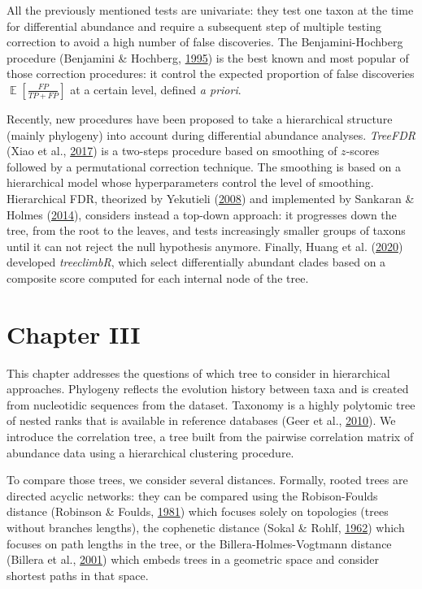 \documentclass[12pt,a4paper]{reedthesis}
\DeclareMathOperator*{\esp}{\mathbb{E}}
\newcommand \EE [1]{\esp\left[{#1}\right]}
\theoremstyle{definition}
\theoremstyle{definition}
\theoremstyle{definition}
\theoremstyle{remark}
\begin{document}
All the previously mentioned tests are univariate: they test one taxon at the time for differential abundance and require a subsequent step of multiple testing correction to avoid a high number of false discoveries. The Benjamini-Hochberg procedure (Benjamini \& Hochberg, \protect\hyperlink{ref-benjamini1995controlling}{1995}) is the best known and most popular of those correction procedures: it control the expected proportion of false discoveries \(\EE{\frac{FP}{TP + FP}}\) at a certain level, defined \emph{a priori}.

Recently, new procedures have been proposed to take a hierarchical structure (mainly phylogeny) into account during differential abundance analyses. \emph{TreeFDR} (Xiao et al., \protect\hyperlink{ref-xiao2017false}{2017}) is a two-steps procedure based on smoothing of \(z\)-scores followed by a permutational correction technique. The smoothing is based on a hierarchical model whose hyperparameters control the level of smoothing. Hierarchical FDR, theorized by Yekutieli (\protect\hyperlink{ref-yekutieli2008hierarchical}{2008}) and implemented by Sankaran \& Holmes (\protect\hyperlink{ref-sankaran2014structssi}{2014}), considers instead a top-down approach: it progresses down the tree, from the root to the leaves, and tests increasingly smaller groups of taxons until it can not reject the null hypothesis anymore. Finally, Huang et al. (\protect\hyperlink{ref-huang2020treeclimbr}{2020}) developed \emph{treeclimbR}, which select differentially abundant clades based on a composite score computed for each internal node of the tree.

\hypertarget{chapter-iii}{%
\section*{Chapter III}\label{chapter-iii}}

This chapter addresses the questions of which tree to consider in hierarchical approaches. Phylogeny reflects the evolution history between taxa and is created from nucleotidic sequences from the dataset. Taxonomy is a highly polytomic tree of nested ranks that is available in reference databases (Geer et al., \protect\hyperlink{ref-geer2010ncbi}{2010}). We introduce the correlation tree, a tree built from the pairwise correlation matrix of abundance data using a hierarchical clustering procedure.

To compare those trees, we consider several distances. Formally, rooted trees are directed acyclic networks: they can be compared using the Robison-Foulds distance (Robinson \& Foulds, \protect\hyperlink{ref-robinson1981comparison}{1981}) which focuses solely on topologies (trees without branches lengths), the cophenetic distance (Sokal \& Rohlf, \protect\hyperlink{ref-sokal1962comparison}{1962}) which focuses on path lengths in the tree, or the Billera-Holmes-Vogtmann distance (Billera et al., \protect\hyperlink{ref-billera2001geometry}{2001}) which embeds trees in a geometric space and consider shortest paths in that space.
\end{document}
